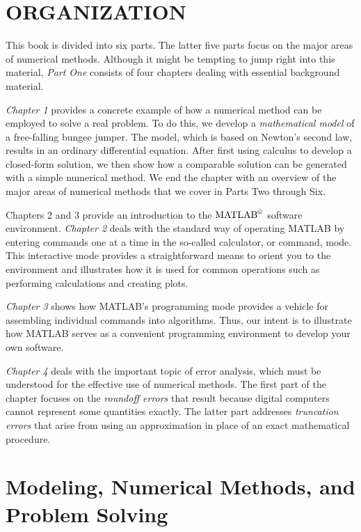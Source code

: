 \documentclass[../main.tex]{subfiles}
\begin{document}
\bigskip
\chapter*{ORGANIZATION}
\label{cha:cha2}
This book is divided into six parts. The latter five parts focus on the major areas of numerical methods. Although it might be tempting to jump right into this material, \textsl{Part One} consists of four chapters dealing with essential background material.


\textsl{Chapter 1} provides a concrete example of how a numerical method can be employed
to solve a real problem. To do this, we develop a \textsl{mathematical model} of a free-falling
bungee jumper. The model, which is based on Newton’s second law, results in an ordinary
differential equation. After first using calculus to develop a closed-form solution, we then
show how a comparable solution can be generated with a simple numerical method. We
end the chapter with an overview of the major areas of numerical methods that we cover in
Parts Two through Six.


Chapters 2 and 3 provide an introduction to the $\text{MATLAB}^\copyright$ software environment.
\textsl{Chapter 2} deals with the standard way of operating MATLAB by entering commands one
at a time in the so-called calculator, or command, mode. This interactive mode provides a
straightforward means to orient you to the environment and illustrates how it is used for
common operations such as performing calculations and creating plots.

\textsl{Chapter 3} shows how MATLAB’s programming mode provides a vehicle for assembling individual commands into algorithms. Thus, our intent is to illustrate how MATLAB
serves as a convenient programming environment to develop your own software.


\textsl{Chapter 4} deals with the important topic of error analysis, which must be understood
for the effective use of numerical methods. The first part of the chapter focuses on the
\textsl{roundoff errors} that result because digital computers cannot represent some quantities
exactly. The latter part addresses \textsl{truncation errors} that arise from using an approximation
in place of an exact mathematical procedure.





\blankpage

\chapter{Modeling, Numerical Methods, and Problem Solving}
\label{cha:cha3}
\end{document}
